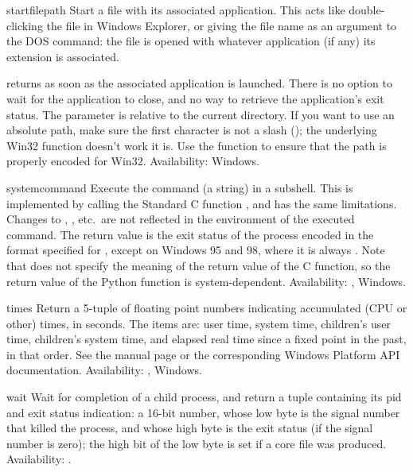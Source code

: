 \begin{funcdesc}{startfile}{path}
Start a file with its associated application.  This acts like
double-clicking the file in Windows Explorer, or giving the file name
as an argument to the DOS  command: the file is opened
with whatever application (if any) its extension is associated.

 returns as soon as the associated application
is launched.  There is no option to wait for the application to close,
and no way to retrieve the application's exit status.  The 
parameter is relative to the current directory.  If you want to use an
absolute path, make sure the first character is not a slash
(\character{/}); the underlying Win32 
function doesn't work it is.  Use the 
function to ensure that the path is properly encoded for Win32.
Availability: Windows.
\end{funcdesc}

\begin{funcdesc}{system}{command}
Execute the command (a string) in a subshell.  This is implemented by
calling the Standard C function , and has the
same limitations.  Changes to , ,
etc.\ are not reflected in the environment of the executed command.
The return value is the exit status of the process encoded in the
format specified for , except on Windows 95 and 98,
where it is always .  Note that \POSIX{} does not specify the
meaning of the return value of the C  function,
so the return value of the Python function is system-dependent.
Availability: \UNIX{}, Windows.
\end{funcdesc}

\begin{funcdesc}{times}{}
Return a 5-tuple of floating point numbers indicating accumulated (CPU
or other)
times, in seconds.  The items are: user time, system time, children's
user time, children's system time, and elapsed real time since a fixed
point in the past, in that order.  See the \UNIX{} manual page
 or the corresponding Windows Platform API
documentation.
Availability: \UNIX{}, Windows.
\end{funcdesc}

\begin{funcdesc}{wait}{}
Wait for completion of a child process, and return a tuple containing
its pid and exit status indication: a 16-bit number, whose low byte is
the signal number that killed the process, and whose high byte is the
exit status (if the signal number is zero); the high bit of the low
byte is set if a core file was produced.
Availability: \UNIX{}.
\end{funcdesc}

